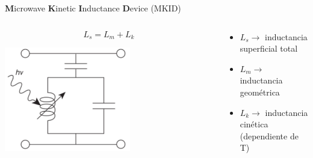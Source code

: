 \documentclass[ignorenonframetext,12pt]{beamer}
\begin{document}
\begin{frame}{\textbf{M}icrowave \textbf{K}inetic \textbf{I}nductance
				\textbf{D}evice (MKID)}
				\begin{columns}
								\begin{column}{0.49\textwidth}
												\begin{equation*}
																L_s = L_m + L_k
												\end{equation*}

											\flushleft	\includegraphics[width=0.6\textwidth]{LCR_mkid}
								\end{column}
								\begin{column}{0.59\textwidth}
				\begin{itemize}
								\item $L_s \to$ inductancia superficial total
								\item $L_m \to$ inductancia geométrica
								\item $L_k \to$ inductancia cinética (dependiente de T)
				\end{itemize}
								\end{column}
				\end{columns}
\end{frame}
\end{document}

